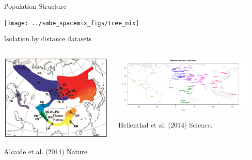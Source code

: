 \documentclass{beamer}
\begin{document}
\begin{frame}{Population Structure}
\pause
	\begin{center} \texttt{[image: ../smbe\_spacemix\_figs/tree\_mix]}
\end{center}

\end{frame}


\begin{frame}{Isolation by distance datasets}
\pause
\begin{columns}
\begin{column}{0.4\textwidth}

	\begin{center} \includegraphics[width=
          0.8
          \textwidth]{../smbe_spacemix_figs/Irwin_warbler_map_figure}
\end{center}
	\vskip -0.5cm
          {\tiny Alcaide et al. (2014) Nature} 
\end{column}
\begin{column}{0.6\textwidth}
\pause 

	\begin{center} \includegraphics[width=
          1.1 \textwidth, height = 0.6 \textheight]{../smbe_spacemix_figs/globe_obs_map_option2}
 \end{center}
          {\tiny Hellenthal et al. (2014) Science.}  
\end{column}
\end{columns}
\end{frame}
\end{document}

